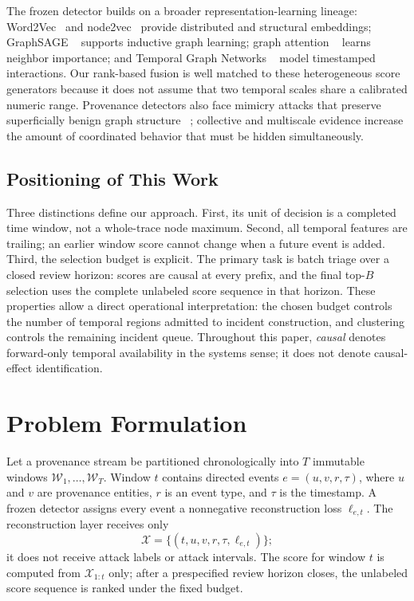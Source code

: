 \documentclass[lettersize,journal]{IEEEtran}
\begin{document}
The frozen detector builds on a broader representation-learning lineage:
Word2Vec~\cite{mikolov2013word2vec} and node2vec~\cite{grover2016node2vec}
provide distributed and structural embeddings; GraphSAGE
~\cite{hamilton2017graphsage} supports inductive graph learning; graph attention
~\cite{velickovic2018gat} learns neighbor importance; and Temporal Graph Networks
~\cite{rossi2020tgn} model timestamped interactions.  Our rank-based fusion is
well matched to these heterogeneous score generators because it does not assume
that two temporal scales share a calibrated numeric range.  Provenance detectors
also face mimicry attacks that preserve superficially benign graph structure
~\cite{goyal2023mimicry}; collective and multiscale evidence increase the amount
of coordinated behavior that must be hidden simultaneously.

\subsection{Positioning of This Work}

Three distinctions define our approach.  First, its unit of decision is a
completed time window, not a whole-trace node maximum.  Second, all temporal
features are trailing; an earlier window score cannot change when a future event
is added.  Third, the selection budget is explicit.  The primary task is batch
triage over a closed review horizon: scores are causal at every prefix, and the
final top-$B$ selection uses the complete unlabeled score sequence in that
horizon.  These properties allow a direct operational interpretation: the
chosen budget controls the number of temporal regions admitted to incident
construction, and clustering controls the remaining incident queue.
Throughout this paper, \emph{causal} denotes forward-only temporal availability
in the systems sense; it does not denote causal-effect identification.

\section{Problem Formulation}
\label{sec:problem}

Let a provenance stream be partitioned chronologically into $T$ immutable
windows $\mathcal{W}_1,\ldots,\mathcal{W}_T$.  Window $t$ contains directed events
$e=(u,v,r,\tau)$, where $u$ and $v$ are provenance entities, $r$ is an event
type, and $\tau$ is the timestamp.  A frozen detector assigns every event a
nonnegative reconstruction loss $\ell_{e,t}$.  The reconstruction layer receives
only
\begin{equation}
  \mathcal{X}=\{(t,u,v,r,\tau,\ell_{e,t})\};
\end{equation}
it does not receive attack labels or attack intervals.  The score for window
$t$ is computed from $\mathcal{X}_{1:t}$ only; after a prespecified review
horizon closes, the unlabeled score sequence is ranked under the fixed budget.
\end{document}
